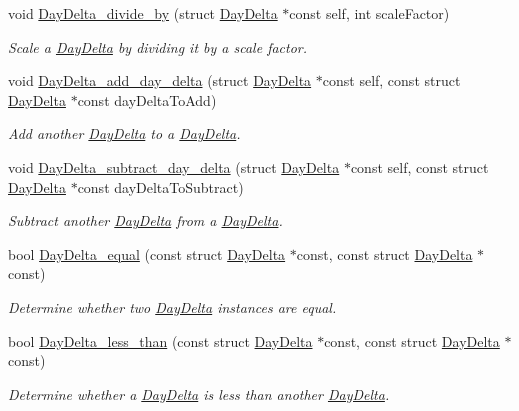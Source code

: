 \begin{DoxyCompactItemize}
void \hyperlink{day-delta_8h_a21da0fd2d2396c2334bf15c462d82ed1}{\-Day\-Delta\-\_\-divide\-\_\-by} (struct \hyperlink{structDayDelta}{\-Day\-Delta} $\ast$const self, int scale\-Factor)
\begin{DoxyCompactList}\small\item\em \-Scale a \hyperlink{structDayDelta}{\-Day\-Delta} by dividing it by a scale factor. \end{DoxyCompactList}\item 
void \hyperlink{day-delta_8h_a426015ccd513669683eeea86fcd0f738}{\-Day\-Delta\-\_\-add\-\_\-day\-\_\-delta} (struct \hyperlink{structDayDelta}{\-Day\-Delta} $\ast$const self, const struct \hyperlink{structDayDelta}{\-Day\-Delta} $\ast$const day\-Delta\-To\-Add)
\begin{DoxyCompactList}\small\item\em \-Add another \hyperlink{structDayDelta}{\-Day\-Delta} to a \hyperlink{structDayDelta}{\-Day\-Delta}. \end{DoxyCompactList}\item 
void \hyperlink{day-delta_8h_a17a8ff4ad84533fa91d3ec4e1c863ef5}{\-Day\-Delta\-\_\-subtract\-\_\-day\-\_\-delta} (struct \hyperlink{structDayDelta}{\-Day\-Delta} $\ast$const self, const struct \hyperlink{structDayDelta}{\-Day\-Delta} $\ast$const day\-Delta\-To\-Subtract)
\begin{DoxyCompactList}\small\item\em \-Subtract another \hyperlink{structDayDelta}{\-Day\-Delta} from a \hyperlink{structDayDelta}{\-Day\-Delta}. \end{DoxyCompactList}\item 
bool \hyperlink{day-delta_8h_af7fb70b781745298c9017fefb858a985}{\-Day\-Delta\-\_\-equal} (const struct \hyperlink{structDayDelta}{\-Day\-Delta} $\ast$const, const struct \hyperlink{structDayDelta}{\-Day\-Delta} $\ast$const)
\begin{DoxyCompactList}\small\item\em \-Determine whether two \hyperlink{structDayDelta}{\-Day\-Delta} instances are equal. \end{DoxyCompactList}\item 
bool \hyperlink{day-delta_8h_aaf16ab17f0559951ce1cb3547b5887c7}{\-Day\-Delta\-\_\-less\-\_\-than} (const struct \hyperlink{structDayDelta}{\-Day\-Delta} $\ast$const, const struct \hyperlink{structDayDelta}{\-Day\-Delta} $\ast$const)
\begin{DoxyCompactList}\small\item\em \-Determine whether a \hyperlink{structDayDelta}{\-Day\-Delta} is less than another \hyperlink{structDayDelta}{\-Day\-Delta}. \end{DoxyCompactList}\item 

\end{DoxyCompactItemize}
